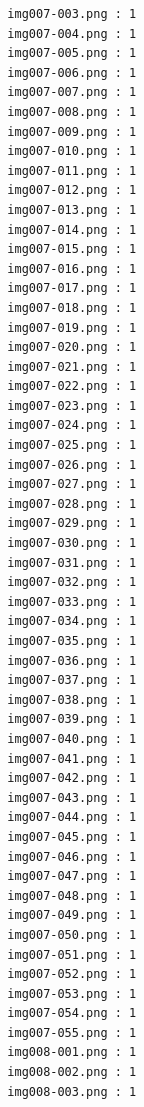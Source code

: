 \documentclass[12pt,a4paper]{article}
\begin{document}
\begin{lstlisting}
                     img007-003.png : 1
                     img007-004.png : 1
                     img007-005.png : 1
                     img007-006.png : 1
                     img007-007.png : 1
                     img007-008.png : 1
                     img007-009.png : 1
                     img007-010.png : 1
                     img007-011.png : 1
                     img007-012.png : 1
                     img007-013.png : 1
                     img007-014.png : 1
                     img007-015.png : 1
                     img007-016.png : 1
                     img007-017.png : 1
                     img007-018.png : 1
                     img007-019.png : 1
                     img007-020.png : 1
                     img007-021.png : 1
                     img007-022.png : 1
                     img007-023.png : 1
                     img007-024.png : 1
                     img007-025.png : 1
                     img007-026.png : 1
                     img007-027.png : 1
                     img007-028.png : 1
                     img007-029.png : 1
                     img007-030.png : 1
                     img007-031.png : 1
                     img007-032.png : 1
                     img007-033.png : 1
                     img007-034.png : 1
                     img007-035.png : 1
                     img007-036.png : 1
                     img007-037.png : 1
                     img007-038.png : 1
                     img007-039.png : 1
                     img007-040.png : 1
                     img007-041.png : 1
                     img007-042.png : 1
                     img007-043.png : 1
                     img007-044.png : 1
                     img007-045.png : 1
                     img007-046.png : 1
                     img007-047.png : 1
                     img007-048.png : 1
                     img007-049.png : 1
                     img007-050.png : 1
                     img007-051.png : 1
                     img007-052.png : 1
                     img007-053.png : 1
                     img007-054.png : 1
                     img007-055.png : 1
                     img008-001.png : 1
                     img008-002.png : 1
                     img008-003.png : 1




\end{lstlisting}
\end{document}

